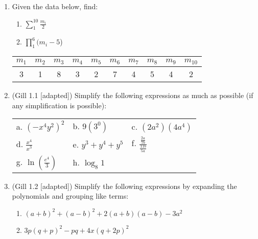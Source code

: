 \documentclass[11pt]{article}
\begin{document}
\begin{enumerate}
\begin{center}
\end{center}


\item Given the data below, find:
\begin{enumerate}
\item $\displaystyle\sum_1^{10} \frac{m_i}{2}$ %
\item $\displaystyle\prod_1^{6} (m_i - 5$) %
\end{enumerate}
\begin{center}
\begin{tabular}{c|c|c|c|c|c|c|c|c|c}
$m_1$  & $m_2$ & $m_3$ & $m_4$ & $m_5$ & $m_6$ & $m_7$ & $m_8$ & $m_9$ & $m_{10}$   \\ \hline
3      & 1     & 8     & 3     & 2     & 7     & 4     & 5     & 4     & 2       \end{tabular}
\end{center}



\item (Gill 1.1 [adapted]) Simplify the following expressions as much as possible (if any simplification is possible):
\begin{center}
\begin{tabular}{p{3cm}p{3cm}p{3cm}}
a. $(-x^4y^2)^2$       &  b. $9(3^0)$                                 & c. $(2a^2)(4a^4)$                     \rule{0cm}{1cm}\\
d. $\displaystyle\frac{x^4}{x^3}$   &  e. $y^3 + y^4 + y^5$                        & f. $\displaystyle\frac{\frac{2a}{7b}}{\frac{11b}{5a}}$ \rule{0cm}{1cm}\\
g. $\ln (\frac{e^4}{3})$& h. $\displaystyle\log_8 1$
\rule{0cm}{1cm}\\
\end{tabular}
\end{center}


\item (Gill 1.2 [adapted]) Simplify the following expressions by expanding the polynomials and grouping like terms:
\begin{enumerate}
		\item $(a+b)^2 + (a-b)^2 + 2(a+b)(a-b) - 3a^2$ %
		\item $3p(q+p)^2 - pq + 4x(q + 2p)^2$ %
\end{enumerate}



\end{enumerate}
\end{document}
